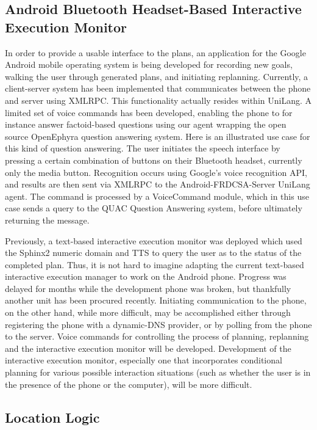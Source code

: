 \documentclass[letterpaper]{article}
\begin{document}
\subsection{Android Bluetooth Headset-Based Interactive Execution Monitor}

\noindent In order to provide a usable interface to the plans, an
application for the Google Android mobile operating system is being
developed for recording new goals, walking the user through generated
plans, and initiating replanning.  Currently, a client-server system
has been implemented that communicates between the phone and server
using XMLRPC.  This functionality actually resides within UniLang.  A
limited set of voice commands has been developed, enabling the phone
to for instance answer factoid-based questions using our agent
wrapping the open source OpenEphyra question answering system.  Here
is an illustrated use case for this kind of question answering.  The
user initiates the speech interface by pressing a certain combination
of buttons on their Bluetooth headset, currently only the media button.
Recognition occurs using Google's voice recognition API, and results
are then sent via XMLRPC to the Android-FRDCSA-Server UniLang agent.
The command is processed by a VoiceCommand module, which in this use
case sends a query to the QUAC Question Answering system, before
ultimately returning the message.

Previously, a text-based interactive execution monitor was deployed
which used the Sphinx2 numeric domain and TTS to query the user as to
the status of the completed plan.  Thus, it is not hard to imagine
adapting the current text-based interactive execution manager to work
on the Android phone.  Progress was delayed for months while the
development phone was broken, but thankfully another unit has been
procured recently.  Initiating communication to the phone, on the
other hand, while more difficult, may be accomplished either through
registering the phone with a dynamic-DNS provider, or by polling from
the phone to the server.  Voice commands for controlling the process
of planning, replanning and the interactive execution monitor will be
developed.  Development of the interactive execution monitor,
especially one that incorporates conditional planning for various
possible interaction situations (such as whether the user is in the
presence of the phone or the computer), will be more difficult.

\subsection{Location Logic}
\end{document}
